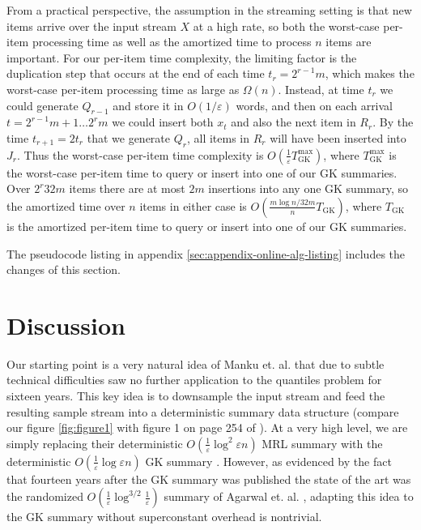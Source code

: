 \documentclass{article}
\theoremstyle{plain}
\def\ep{\varepsilon}
\def\pl{\!+\!}
\newcommand{\p}[1]{(#1)}
\newcommand{\OO}[1]{O\p{#1}}
\newcommand{\OT}[1]{\Omega\p{#1}}
\begin{document}
From a practical perspective, the assumption in the streaming setting is that
new items arrive over the input stream $X$ at a high rate, so both the
worst-case per-item processing time as well as the amortized time to process $n$
items are important. For our per-item time complexity, the limiting factor is
the duplication step that occurs at the end of each time $t_r = 2^{r-1} m$,
which makes the worst-case per-item processing time as large as $\OT{n}$.
Instead, at time $t_r$ we could generate $Q_{r-1}$ and store it in $\OO{1/\ep}$
words, and then on each arrival $t = 2^{r-1} m \pl 1 \ldots 2^r m$ we could
insert both $x_t$ and also the next item in $R_r$. By the time $t_{r+1} = 2 t_r$
that we generate $Q_r$, all items in $R_r$ will have been inserted into $J_r$.
Thus the worst-case per-item time complexity is $\OO{\frac{1}{\ep}
  T_{\text{GK}}^{\text{max}}}$, where $T_{\text{GK}}^{\text{max}}$ is the
worst-case per-item time to query or insert into one of our GK summaries.
Over $2^r 32 m$ items there are at most $2 m$ insertions into any one GK
summary, so the amortized time over $n$ items in either case is $\OO{\frac{m
    \log n / 32 m}{n} T_{\text{GK}}}$, where $T_{\text{GK}}$ is the amortized
per-item time to query or insert into one of our GK summaries.

The pseudocode listing in appendix \ref{sec:appendix-online-alg-listing}
includes the changes of this section.
 
\section{Discussion}
\label{sec:discussion}

Our starting point is a very natural idea of Manku et. al. \cite{MRL1999} that
due to subtle technical difficulties saw no further application to the quantiles
problem for sixteen years. This key idea is to downsample the input stream and
feed the resulting sample stream into a deterministic summary data structure
(compare our figure \ref{fig:figure1} with figure 1 on page 254 of
\cite{MRL1999}). At a very high level, we are simply replacing their
deterministic $\OO{\frac{1}{\ep} \log^2 \ep n}$ MRL summary \cite{MRL1998} with
the deterministic $\OO{\frac{1}{\ep} \log \ep n}$ GK summary \cite{GK2001}.
However, as evidenced by the fact that fourteen years after the GK summary was
published the state of the art was the randomized $\OO{\frac{1}{\ep} \log^{3/2}
  \frac{1}{\ep}}$ summary of Agarwal et. al. \cite{ACHPWY2012}
\cite{ACHPWY2013}, adapting this idea to the GK summary without superconstant
overhead is nontrivial.
\end{document}
